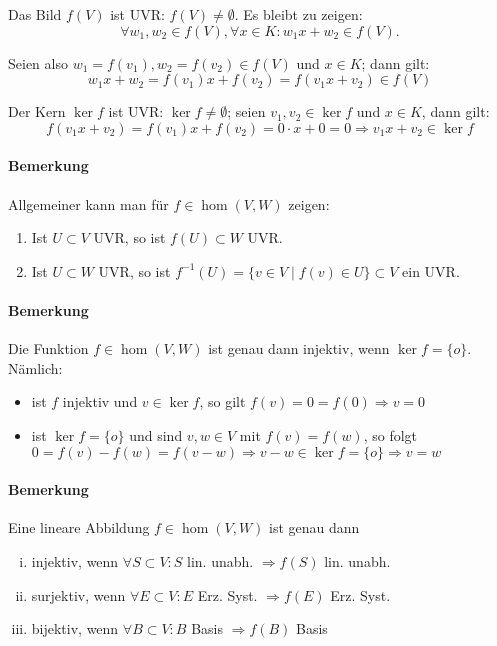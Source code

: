 	Das Bild $f(V)$ ist UVR: $f(V) \neq \emptyset$. Es bleibt zu zeigen:
		\begin{equation*}
			\forall w_1,w_2\in f(V), \forall x\in K: w_1x+w_2 \in f(V).
		\end{equation*}
	
	Seien also $w_1 = f(v_1), w_2 = f(v_2) \in f(V)$ und $x\in K$; dann gilt:
		\begin{equation*}
			w_1x+w_2 = f(v_1)x+f(v_2) = f(v_1x+v_2)\in f(V)
		\end{equation*}
		
	Der Kern $\ker f$ ist UVR: $\ker f\neq \emptyset$; seien $v_1,v_2\in \ker f$ und $x\in K$, dann gilt:
		\begin{equation*}
			f(v_1x+v_2) = f(v_1)x+f(v_2) = 0\cdot x + 0 = 0 \Rightarrow v_1x+v_2\in \ker f
		\end{equation*}

\paragraph{Bemerkung}
	Allgemeiner kann man für $f\in \hom (V,W)$ zeigen:
		\begin{enumerate}
			\item Ist $U\subset V$ UVR, so ist $f(U)\subset W$ UVR.
			\item Ist $U\subset W$ UVR, so ist $f^{-1}(U) = \{v\in V\mid f(v) \in U \}\subset V$ ein UVR.
		\end{enumerate}

\paragraph{Bemerkung}
	Die Funktion $f\in \hom (V,W)$ ist genau dann injektiv, wenn $\ker f = \{o\}$. Nämlich:
		\begin{itemize}
			\item ist $f$ injektiv und $v\in \ker f$, so gilt $f(v) = 0 = f(0) \Rightarrow v=0$
			\item ist $\ker f = \{ o \}$ und sind $v,w \in V$ mit $f(v) = f(w)$, so folgt\\
				$0=f(v)-f(w) = f(v-w) \Rightarrow v-w\in \ker f = \{o\} \Rightarrow v = w$
		\end{itemize}

\paragraph{Bemerkung}
	Eine lineare Abbildung $ f\in \hom (V,W) $ ist genau dann
		\begin{enumerate}[(i)]
			\item injektiv, wenn $ \forall S\subset V: S$ lin. unabh. $ \Rightarrow f(S) $ lin. unabh.
			\item surjektiv, wenn $ \forall E \subset V:E $ Erz. Syst. $ \Rightarrow f(E)$ Erz. Syst.
			\item bijektiv, wenn $ \forall B\subset V: B$ Basis $ \Rightarrow f(B)$ Basis
		\end{enumerate}

